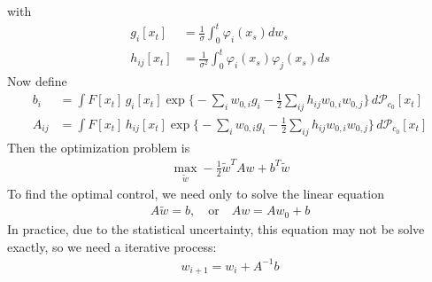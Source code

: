 \documentclass[aip,jcp,a4paper,reprint,onecolumn]{revtex4-1}
\newcommand{\pathmeas}{d\mathcal P}
\begin{document}
with
\begin{align}
  g_i[x_t] & = \frac 1\sigma\int_0^t \varphi_i(x_s) dw_s \\
  h_{ij}[x_t] & = \frac1{\sigma^2} \int_0^t \varphi_i(x_s)  \varphi_j(x_s) ds
\end{align}
Now define
\begin{align}
  b_i & = \int F[x_t]\, g_{i}[x_t] \exp \Big\{
  - \sum_i w_{0,i} g_i - \frac 12 \sum_{ij} h_{ij} w_{0,i}    w_{0,j} \Big\}
  \,\pathmeas_{c_0}[x_t]\\
  A_{ij} & = \int F[x_t]\, h_{ij}[x_t] \exp \Big\{
  - \sum_i w_{0,i} g_i - \frac 12 \sum_{ij} h_{ij} w_{0,i}    w_{0,j} \Big\}
  \,\pathmeas_{c_0}[x_t]
\end{align}
Then the optimization problem is
\begin{align}
  \max_{\tilde w } -\frac 12 \tilde w^T A w + b^T \tilde w
\end{align}
To find the optimal control, we need only to solve the linear equation
\begin{align}
  A\tilde w = b, \quad \textrm{or}\quad A w = A w_0 + b
\end{align}
In practice, due to the statistical uncertainty, this equation may not
be solve exactly, so we need a iterative process:
\begin{align}
  w_{i+1} = w_i + A^{-1}b
\end{align}
\end{document}
